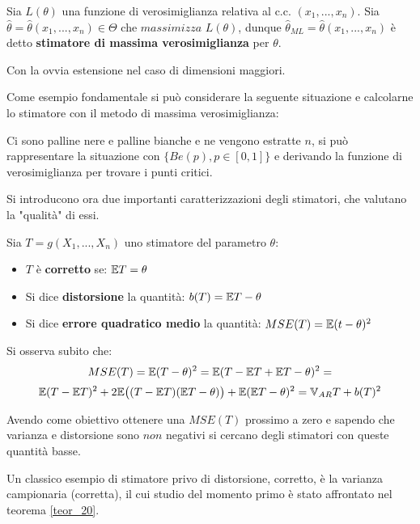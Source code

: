 \begin{itemize}
\begin{definition}
Sia $L(\theta)$ una funzione di verosimiglianza relativa al c.c. $(x_1,...,x_n)$. Sia $\hat{\theta}=\hat{\theta}(x_1,...,x_n)\in\Theta$ che $massimizza$  $L(\theta)$, dunque $\hat{\theta}_{ML}=\hat{\theta}(x_1,...,x_n)$ è detto \textbf{stimatore di massima verosimiglianza} per $\theta$.

Con la ovvia estensione nel caso di dimensioni maggiori.
\end{definition}

Come esempio fondamentale si può considerare la seguente situazione e calcolarne lo stimatore con il metodo di massima verosimiglianza:

Ci sono palline nere e palline bianche e ne vengono estratte $n$, si può rappresentare la situazione con $\{Be(p), p\in[0,1]\}$ e derivando la funzione di verosimiglianza per trovare i punti critici.
\end{itemize}


\vspace{15px}

Si introducono ora due importanti caratterizzazioni degli stimatori, che \newline valutano la "qualità" di essi.

\begin{definition}
Sia $T=g(X_1,...,X_n)$ uno stimatore del parametro $\theta$:
\begin{itemize}
    \item $T$ è \textbf{corretto} se: $\mathbb{E} T=\theta$
    \item Si dice \textbf{distorsione} la quantità: $b(T)=\mathbb{E} T-\theta$
    \item Si dice \textbf{errore quadratico medio} la quantità: $MSE(T)=\mathbb{E} (t-\theta)^2$
\end{itemize}
\end{definition}

\vspace{5px}

Si osserva subito che: \[MSE(T)=\mathbb{E}(T-\theta)^2=\mathbb{E}(T-\mathbb{E} T +\mathbb{E} T-\theta)^2=\]
\[\mathbb{E}(T-\mathbb{E} T)^2+2\mathbb{E}\big((T-\mathbb{E} T)(\mathbb{E} T-\theta)\big)+\mathbb{E}(\mathbb{E} T-\theta)^2=\mathbb{V}_{AR} T +b(T)^2\]

Avendo come obiettivo ottenere una $MSE(T)$ prossimo a zero e sapendo che varianza e distorsione sono $non$ negativi si cercano degli stimatori con queste quantità basse.

Un classico esempio di stimatore privo di distorsione, corretto, è la varianza campionaria (corretta), il cui studio del momento primo è stato affrontato nel teorema \ref{teor_20}.